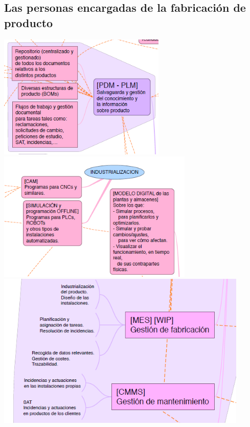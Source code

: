 \documentclass[spanish,12pt,a4paper,final,oneside]{book}
\begin{document}
\subsection{Las personas encargadas de la fabricación de producto}
\includegraphics[width=0.6\textwidth]{subesquema - fabricacion01}
\\ \includegraphics[width=0.7\textwidth]{subesquema - fabricacion02}
\\ \includegraphics[width=0.9\textwidth]{subesquema - fabricacion04}
\end{document}

